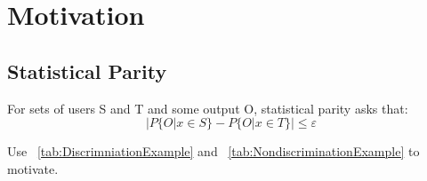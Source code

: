 \section{Motivation}
%

\subsection{Statistical Parity}
For sets of users S and T and some output O, statistical parity asks that:
\begin{equation}
|P\{O | x \in S\} - P\{O | x \in T\}| \le \varepsilon
\label{eq:StatisticalParity}
\end{equation}

Use ~\ref{tab:DiscrimniationExample} and ~\ref{tab:NondiscriminationExample} to motivate.

